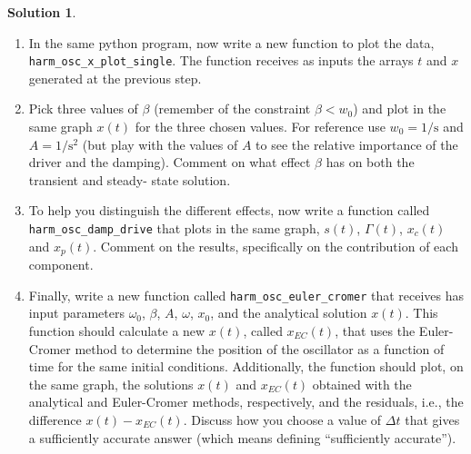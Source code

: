 \documentclass[10pt]{article}
\theoremstyle{definition}
\newtheorem{soln}{Solution}
\begin{document}
\begin{soln}
\begin{enumerate}[label=(\alph*)]
            \item In the same python program, now write a new function to plot the data, \verb|harm_osc_x_plot_single|. The
                  function receives as inputs the arrays $t$ and $x$ generated at the previous step.

            \item Pick three values of $\beta$ (remember of the constraint $\beta<w_0$) and plot in the same graph $x(t)$ for the three
                  chosen values. For reference use $w_0=1\unit{\per\second}$ and $A=1\unit{\per\second\squared}$ (but play with the values of $A$ to see the relative
                  importance of the driver and the damping). Comment on what effect $\beta$ has on both the transient and steady- state solution.

            \item To help you distinguish the different effects, now write a function called \verb|harm_osc_damp_drive| that plots
                  in the same graph, $s(t)$, $\Gamma(t)$, $x_c(t)$ and $x_p(t)$. Comment on the results, specifically on the contribution of each component.

            \item Finally, write a new function called \verb|harm_osc_euler_cromer| that receives has input parameters $\omega_0$, $\beta$,
                  $A$, $\omega$, $x_0$, and the analytical solution $x(t)$. This function should calculate a new $x(t)$, called $x_{EC}(t)$, that uses
                  the Euler-Cromer method to determine the position of the oscillator as a function of time for the same initial conditions. Additionally, the function should
                  plot, on the same graph, the solutions $x(t)$ and $x_{EC}(t)$ obtained with the analytical and Euler-Cromer methods, respectively, and the residuals, i.e.,
                  the difference $x(t)-x_{EC}(t)$. Discuss how you choose a value of $\Delta t$ that gives a sufficiently accurate answer (which means defining
                  ``sufficiently accurate'').
      \end{enumerate}
\end{soln}
\end{document}
